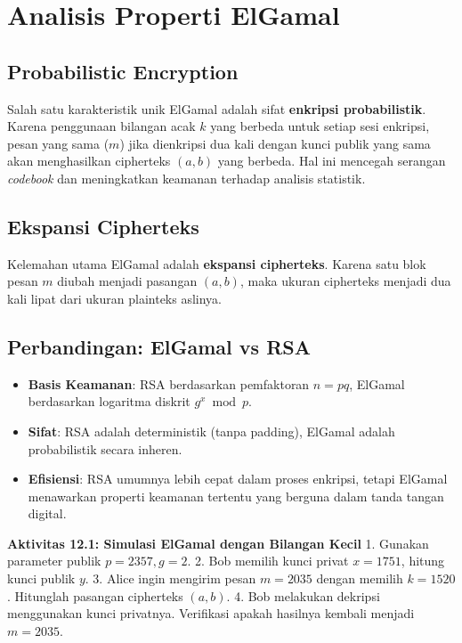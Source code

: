 \documentclass[../main.tex]{subfiles}
\begin{document}
\section{Analisis Properti ElGamal}
\subsection{Probabilistic Encryption}
Salah satu karakteristik unik ElGamal adalah sifat \textbf{enkripsi probabilistik}. Karena penggunaan bilangan acak $k$ yang berbeda untuk setiap sesi enkripsi, pesan yang sama ($m$) jika dienkripsi dua kali dengan kunci publik yang sama akan menghasilkan cipherteks $(a, b)$ yang berbeda. Hal ini mencegah serangan \textit{codebook} dan meningkatkan keamanan terhadap analisis statistik.

\subsection{Ekspansi Cipherteks}
Kelemahan utama ElGamal adalah \textbf{ekspansi cipherteks}. Karena satu blok pesan $m$ diubah menjadi pasangan $(a, b)$, maka ukuran cipherteks menjadi dua kali lipat dari ukuran plainteks aslinya.

\subsection{Perbandingan: ElGamal vs RSA}
\begin{itemize}
    \item \textbf{Basis Keamanan}: RSA berdasarkan pemfaktoran $n=pq$, ElGamal berdasarkan logaritma diskrit $g^x \bmod p$.
    \item \textbf{Sifat}: RSA adalah deterministik (tanpa padding), ElGamal adalah probabilistik secara inheren.
    \item \textbf{Efisiensi}: RSA umumnya lebih cepat dalam proses enkripsi, tetapi ElGamal menawarkan properti keamanan tertentu yang berguna dalam tanda tangan digital.
\end{itemize}

\begin{obeactivity}
\textbf{Aktivitas 12.1: Simulasi ElGamal dengan Bilangan Kecil}
1. Gunakan parameter publik $p = 2357, g = 2$.
2. Bob memilih kunci privat $x = 1751$, hitung kunci publik $y$.
3. Alice ingin mengirim pesan $m = 2035$ dengan memilih $k = 1520$. Hitunglah pasangan cipherteks $(a, b)$.
4. Bob melakukan dekripsi menggunakan kunci privatnya. Verifikasi apakah hasilnya kembali menjadi $m = 2035$.
\end{obeactivity}
\end{document}
